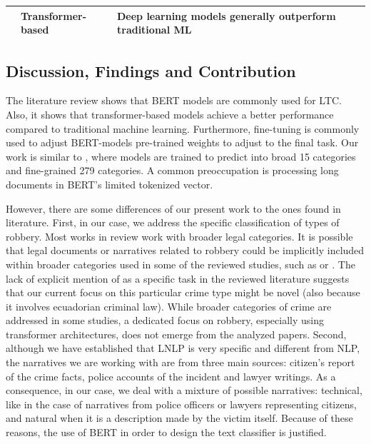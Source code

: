 \documentclass[onecolumn, journal, english, 12pt, a4paper]{IEEEtran} %
\theoremstyle{definition}
\begin{document}
\begin{table}[htbp]
\begin{tabularx}{\textwidth}{|XXXX|}
                                                   & Transformer-based
                                                                    &
                                                                      Deep
                                                                      learning
                                                                      models
                                                                      generally
                                                                      outperform
                                                                      traditional
                                                                      ML\\
      \hline
      
    \end{tabularx}
\end{table}

\subsection{Discussion, Findings and Contribution}
\label{sec:discussion-findings}
The literature review shows that BERT models are commonly used for
LTC. Also, it shows that transformer-based models achieve a better
performance compared to traditional machine
learning\cite{Akca2022}. Furthermore, fine-tuning is commonly used to
adjust BERT-models pre-trained weights to adjust to the final
task. Our work is similar to \cite{Vatsal2023}, where models are
trained to predict into broad 15 categories and fine-grained 279
categories. A common preoccupation is processing long documents in
BERT's limited tokenized vector.

However, there are some differences of our present work to the ones
found in literature. First, in our case, we address the specific
classification of types of robbery. Most works in review work with
broader legal categories. It is possible that legal documents or
narratives related to robbery could be implicitly included within
broader categories used in some of the reviewed studies, such as
 or . The lack of explicit
mention of  as a specific task in the
reviewed literature suggests that our current focus on this particular
crime type might be novel (also because it involves ecuadorian
criminal law). While broader categories of crime are
addressed in some studies, a dedicated focus on robbery, especially
using transformer architectures, does not emerge from the analyzed
papers. Second, although we have established that LNLP is very
specific and different from NLP, the narratives we are working with
are from three main sources: citizen's report of the crime facts,
police accounts of the incident and lawyer writings. As a consequence,
in our case, we deal with a mixture of possible narratives: technical,
like in the case of narratives from police officers or lawyers
representing citizens, and natural when it is a description made by
the victim itself. Because of these reasons, the use of BERT in order
to design the text classifier is justified.
\end{document}
